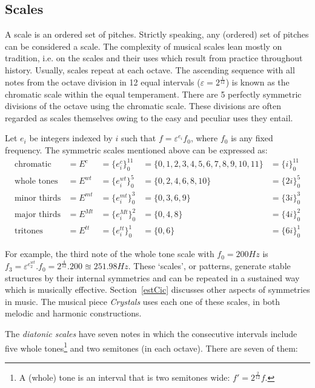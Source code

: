 \documentclass[format=acmsmall, review=false, screen=true]{acmart}
\begin{document}
\subsection{Scales}\label{subsec:escalas}
A scale is an ordered set of pitches. Strictly speaking, any (ordered) set of pitches can be considered a scale. The complexity of musical scales lean mostly on tradition, i.e. on the scales and their uses which result from practice throughout history. Usually, scales repeat at each octave. The ascending sequence with all notes from the octave division in 12 equal intervals ($\varepsilon=2^{\frac{1}{12}}$) is known as the chromatic scale within the equal temperament. There are 5 perfectly symmetric divisions of the octave using the chromatic scale. These divisions are often regarded as scales themselves owing to the easy and peculiar uses they entail.

Let $e_i$ be integers indexed by $i$ such that
$f=\varepsilon^{e_i} f_0$,
where $f_0$ is any fixed frequency.
The symmetric scales mentioned above can be expressed as:
\begin{equation}\label{escSim}
\begin{aligned}
	\text{chromatic}    & = E^c    & = \{e_i^c\}_0^{11}   & =  \{0,1,2,3,4,5,6,7,8,9,10,11\} & = \{i\}_0^{11}\\
	\text{whole tones}  & = E^{wt} & = \{e_i^{wt}\}_0^{5} & = \{0,2,4,6,8,10\}               & = \{2i\}_0^{5} \\
	\text{minor thirds} & = E^{mt} & = \{e_i^{mt}\}_0^{3} & = \{0,3,6,9\}                    & = \{3i\}_0^3 \\
	\text{major thirds} & = E^{Mt} & = \{e_i^{Mt}\}_0^{2} & = \{0,4,8\}                      & = \{4i\}_0^2\\
	\text{tritones}     & = E^{tt} & = \{e_i^{tt}\}_0^{1} & = \{ 0, 6 \}                     & = \{6i\}_0^1
\end{aligned}
\end{equation}

For example, the third note of the whole tone scale with $f_0=200Hz$ is $f_3=\varepsilon^{e_2^{wt}}.
f_0 = 2^{\frac{4}{12}} .
200 \approxeq 251.98
Hz$.
These `scales', or patterns, generate stable structures by their internal symmetries and can be repeated in a sustained way which is musically effective.
Section~\ref{estCic} discusses other aspects of symmetries in music.
The musical piece \emph{Crystals} uses each one of these scales, in both melodic and harmonic constructions.

The \emph{diatonic scales} have seven notes in which the consecutive intervals include five whole tones\footnote{A (whole) tone is an interval that is two semitones wide: $f'=2^{\frac{2}{12}}f$.} and two semitones (in each octave). There are seven of them:
\end{document}
